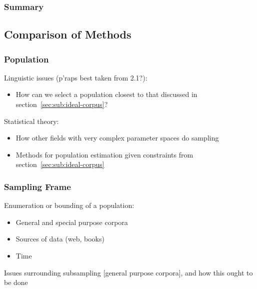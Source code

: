 \subsubsection{Summary}




\subsection{Comparison of Methods}
\subsubsection{Population}
Linguistic issues (p'raps best taken from 2.1?):
\begin{itemize}
    \item How can we select a population closest to that discussed in section~\ref{sec:sub:ideal-corpus}?
\end{itemize}
Statistical theory:
\begin{itemize}
    \item How other fields with very complex parameter spaces do sampling
    \item Methods for population estimation given constraints from section~\ref{sec:sub:ideal-corpus}
\end{itemize}
\subsubsection{Sampling Frame}
Enumeration or bounding of a population:
\begin{itemize}
    \item General and special purpose corpora
    \item Sources of data (web, books)
    \item Time
\end{itemize}
Issues surrounding subsampling [general purpose corpora], and how this ought to be done

